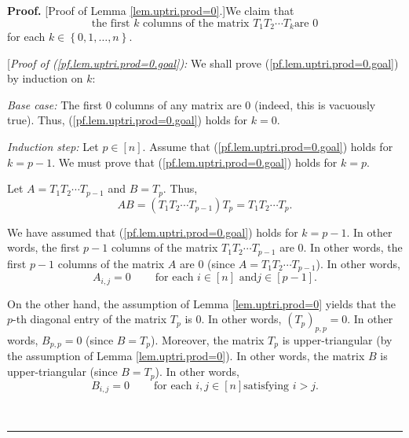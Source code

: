 \documentclass[numbers=enddot,12pt,final,onecolumn,notitlepage]{scrartcl}%
\numberwithin{exer}{subsection}
\theoremstyle{definition}
\newenvironment{proof}[1][Proof]{\noindent\textbf{#1.} }{\ \rule{0.5em}{0.5em}}
\begin{document}
\begin{proof}
[Proof of Lemma \ref{lem.uptri.prod=0}.]We claim that%
\begin{equation}
\text{the first }k\text{ columns of the matrix }T_{1}T_{2}\cdots T_{k}\text{
are }0 \label{pf.lem.uptri.prod=0.goal}%
\end{equation}
for each $k\in\left\{  0,1,\ldots,n\right\}  $.

[\textit{Proof of (\ref{pf.lem.uptri.prod=0.goal}):} We shall prove
(\ref{pf.lem.uptri.prod=0.goal}) by induction on $k$:

\textit{Base case:} The first $0$ columns of any matrix are $0$ (indeed, this
is vacuously true). Thus, (\ref{pf.lem.uptri.prod=0.goal}) holds for $k=0$.

\textit{Induction step:} Let $p\in\left[  n\right]  $. Assume that
(\ref{pf.lem.uptri.prod=0.goal}) holds for $k=p-1$. We must prove that
(\ref{pf.lem.uptri.prod=0.goal}) holds for $k=p$.

Let $A=T_{1}T_{2}\cdots T_{p-1}$ and $B=T_{p}$. Thus,%
\begin{equation}
AB=\left(  T_{1}T_{2}\cdots T_{p-1}\right)  T_{p}=T_{1}T_{2}\cdots T_{p}.
\label{pf.lem.uptri.prod=0.1}%
\end{equation}


We have assumed that (\ref{pf.lem.uptri.prod=0.goal}) holds for $k=p-1$. In
other words, the first $p-1$ columns of the matrix $T_{1}T_{2}\cdots T_{p-1}$
are $0$. In other words, the first $p-1$ columns of the matrix $A$ are $0$
(since $A=T_{1}T_{2}\cdots T_{p-1}$). In other words,%
\begin{equation}
A_{i,j}=0\ \ \ \ \ \ \ \ \ \ \text{for each }i\in\left[  n\right]  \text{ and
}j\in\left[  p-1\right]  . \label{pf.lem.uptri.prod=0.2}%
\end{equation}


On the other hand, the assumption of Lemma \ref{lem.uptri.prod=0} yields that
the $p$-th diagonal entry of the matrix $T_{p}$ is $0$. In other words,
$\left(  T_{p}\right)  _{p,p}=0$. In other words, $B_{p,p}=0$ (since $B=T_{p}%
$). Moreover, the matrix $T_{p}$ is upper-triangular (by the assumption of
Lemma \ref{lem.uptri.prod=0}). In other words, the matrix $B$ is
upper-triangular (since $B=T_{p}$). In other words,%
\begin{equation}
B_{i,j}=0\ \ \ \ \ \ \ \ \ \ \text{for each }i,j\in\left[  n\right]  \text{
satisfying }i>j. \label{pf.lem.uptri.prod=0.3}%
\end{equation}



\end{proof}
\end{document}
